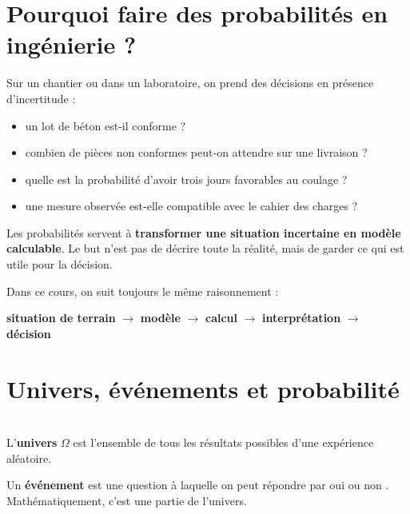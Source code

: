 
\section{Pourquoi faire des probabilités en ingénierie ?}

Sur un chantier ou dans un laboratoire, on prend des décisions en présence d'incertitude :
\begin{itemize}
    \item un lot de béton est-il conforme ?
    \item combien de pièces non conformes peut-on attendre sur une livraison ?
    \item quelle est la probabilité d'avoir trois jours favorables au coulage ?
    \item une mesure observée est-elle compatible avec le cahier des charges ?
\end{itemize}

Les probabilités servent à \textbf{transformer une situation incertaine en modèle calculable}. Le but n'est pas de décrire toute la réalité, mais de garder ce qui est utile pour la décision.

\begin{Rmq}
Dans ce cours, on suit toujours le même raisonnement :
\begin{center}
\textbf{situation de terrain} $\rightarrow$ \textbf{modèle} $\rightarrow$ \textbf{calcul} $\rightarrow$ \textbf{interprétation} $\rightarrow$ \textbf{décision}
\end{center}
\end{Rmq}

\section{Univers, événements et probabilité}

\begin{Def} 
\leavevmode \\
L'\textbf{univers} $\Omega$ est l'ensemble de tous les résultats possibles d'une expérience aléatoire.
\end{Def}

\begin{Def}
Un \textbf{événement} est une question à laquelle on peut répondre par \og oui \fg{} ou \og non \fg{}. Mathématiquement, c'est une partie de l'univers.
\end{Def}

